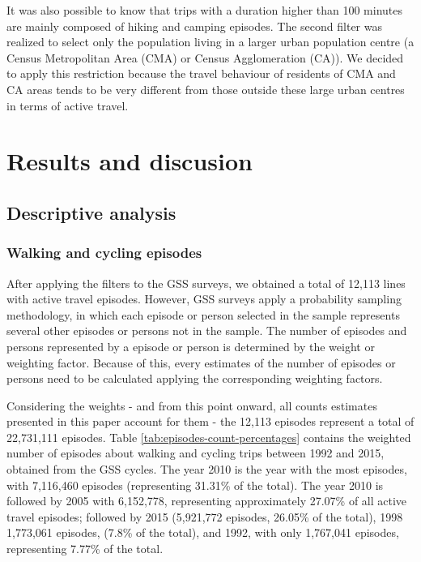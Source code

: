 \documentclass[preprint, 3p,
authoryear]{elsarticle} %
\begin{document}
It was also possible to know that trips with a duration higher than 100
minutes are mainly composed of hiking and camping episodes. The second
filter was realized to select only the population living in a larger
urban population centre (a Census Metropolitan Area (CMA) or Census
Agglomeration (CA)). We decided to apply this restriction because the
travel behaviour of residents of CMA and CA areas tends to be very
different from those outside these large urban centres in terms of
active travel.

\hypertarget{results-and-discusion}{%
\section{Results and discusion}\label{results-and-discusion}}

\hypertarget{descriptive-analysis}{%
\subsection{Descriptive analysis}\label{descriptive-analysis}}

\hypertarget{walking-and-cycling-episodes}{%
\subsubsection{Walking and cycling
episodes}\label{walking-and-cycling-episodes}}

After applying the filters to the GSS surveys, we obtained a total of
12,113 lines with active travel episodes. However, GSS surveys apply a
probability sampling methodology, in which each episode or person
selected in the sample represents several other episodes or persons not
in the sample. The number of episodes and persons represented by a
episode or person is determined by the weight or weighting factor.
Because of this, every estimates of the number of episodes or persons
need to be calculated applying the corresponding weighting factors.

Considering the weights - and from this point onward, all counts
estimates presented in this paper account for them - the 12,113 episodes
represent a total of 22,731,111 episodes. Table
\ref{tab:episodes-count-percentages} contains the weighted number of
episodes about walking and cycling trips between 1992 and 2015, obtained
from the GSS cycles. The year 2010 is the year with the most episodes,
with 7,116,460 episodes (representing 31.31\% of the total). The year
2010 is followed by 2005 with 6,152,778, representing approximately
27.07\% of all active travel episodes; followed by 2015 (5,921,772
episodes, 26.05\% of the total), 1998 1,773,061 episodes, (7.8\% of the
total), and 1992, with only 1,767,041 episodes, representing 7.77\% of
the total.
\end{document}
